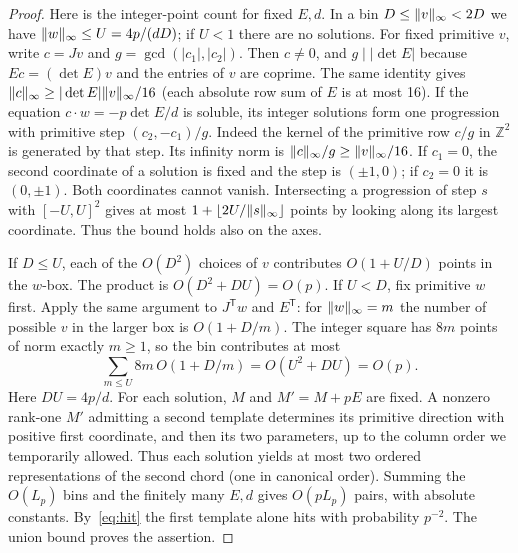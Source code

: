 \begin{proof}
Here is the integer-point count for fixed $E,d$. In a bin $D\le\lVert v\rVert_\infty<2D$ we have $\lVert w\rVert_\infty\le U=4p/(dD)$; if $U<1$ there are no solutions. For fixed primitive $v$, write $c=Jv$ and $g=\gcd(|c_1|,|c_2|)$. Then $c\ne0$, and $g\mid |\det E|$ because $Ec=(\det E)v$ and the entries of $v$ are coprime. The same identity gives $\lVert c\rVert_\infty\ge |\det E|\lVert v\rVert_\infty/16$ (each absolute row sum of $E$ is at most 16). If the equation $c\cdot w=-p\det E/d$ is soluble, its integer solutions form one progression with primitive step $(c_2,-c_1)/g$. Indeed the kernel of the primitive row $c/g$ in $\mathbb Z^2$ is generated by that step. Its infinity norm is $\lVert c\rVert_\infty/g\ge\lVert v\rVert_\infty/16$. If $c_1=0$, the second coordinate of a solution is fixed and the step is $(\pm1,0)$; if $c_2=0$ it is $(0,\pm1)$. Both coordinates cannot vanish. Intersecting a progression of step $s$ with $[-U,U]^2$ gives at most $1+\lfloor 2U/\lVert s\rVert_\infty\rfloor$ points by looking along its largest coordinate. Thus the bound holds also on the axes.

If $D\le U$, each of the $O(D^2)$ choices of $v$ contributes $O(1+U/D)$ points in the $w$-box. The product is $O(D^2+DU)=O(p)$. If $U<D$, fix primitive $w$ first. Apply the same argument to $J^{\mathsf T}w$ and $E^{\mathsf T}$: for $\lVert w\rVert_\infty=m$ the number of possible $v$ in the larger box is $O(1+D/m)$. The integer square has $8m$ points of norm exactly $m\ge1$, so the bin contributes at most
\[
 \sum_{m\le U}8m\,O(1+D/m)=O(U^2+DU)=O(p).
\]
Here $DU=4p/d$. For each solution, $M$ and $M'=M+pE$ are fixed. A nonzero rank-one $M'$ admitting a second template determines its primitive direction with positive first coordinate, and then its two parameters, up to the column order we temporarily allowed. Thus each solution yields at most two ordered representations of the second chord (one in canonical order). Summing the $O(L_p)$ bins and the finitely many $E,d$ gives $O(pL_p)$ pairs, with absolute constants. By~\eqref{eq:hit} the first template alone hits with probability $p^{-2}$. The union bound proves the assertion.
\end{proof}

